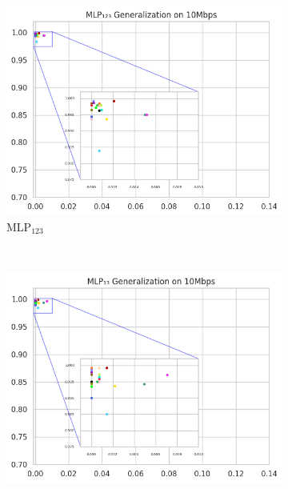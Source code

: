 \documentclass[a4paper,fleqn]{cas-sc}
\begin{document}
\begin{figure}[h!]
	\centering	
	\begin{minipage}[t]{0.46\textwidth} %
		\centering
		
		
			\begin{subfigure}[t]{0.33\textwidth}
				
				\includegraphics[draft=false, width=\textwidth]{./figs/Generalizacao-MLP123-10Mbps.png} 
				\caption{MLP$_{123}$}
				\label{fig:Generalizacao-MLP123-10Mbps}
			\end{subfigure}%
			~
			\begin{subfigure}[t]{0.33\textwidth}
				\includegraphics[draft=false, width=\textwidth]{./figs/Generalizacao-MLP13-10Mbps.png} 

\end{subfigure}
\end{minipage}
\end{figure}
\end{document}
